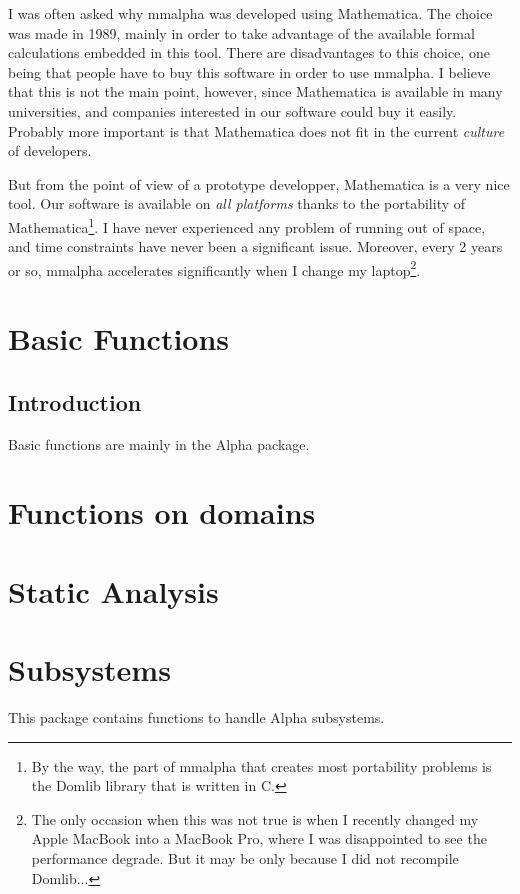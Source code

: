 \documentclass[11pt]{report}
\newcommand{\MMAlfa}{{\sc mmalpha}}
\newcommand{\mma}{{\sc Mathematica}}
\begin{document}
I was often asked why \MMAlfa{} was developed using \mma{}. The 
choice was made in 1989, mainly in order to take advantage of the 
available formal calculations embedded in this tool. There are
disadvantages to this choice, one being that people have
to buy this software in order to use \MMAlfa{}. I believe that this
is not the main point, however, since \mma{} is available in many
universities, and companies interested in our software could 
buy it easily. Probably more important is that \mma{} does not fit in 
the current {\em culture} of developers. 

But from the point of view of a prototype developper, \mma{} is 
a very nice tool. Our software is available on {\em all platforms}
thanks to the portability of \mma{}\footnote{By the way, the 
part of \MMAlfa{} that creates most portability problems is 
the Domlib library that is written in C.}. I have never experienced 
any problem of running out of space, and time constraints have 
never been a significant issue. Moreover, every 2 years or so, 
\MMAlfa{} accelerates significantly when I change my laptop\footnote{The only
occasion when this was not true is when I recently changed my Apple MacBook 
into a MacBook Pro, where I was disappointed to see the performance
degrade. But it may be only because I did not recompile Domlib...}.

\chapter{Basic Functions}
\label{basicfunctions}

\section{Introduction}
Basic functions are mainly in the Alpha package.


\chapter{Functions on domains}
\label{domainfunctions}

\chapter{Static Analysis}
\label{staticfunctions}



\chapter{Subsystems}
This package contains functions to handle Alpha subsystems.
\label{subsystemfunctions}

\end{document}
